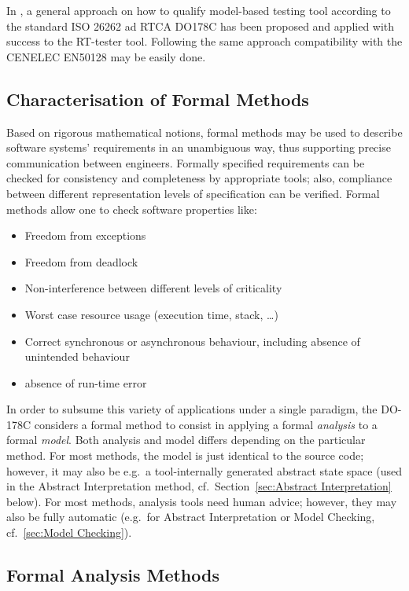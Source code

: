 \documentclass{template/openetcs_report}
\begin{document}
In \cite{brauer_efficient_2012}, a general approach  on how to qualify
model-based testing tool according to the standard ISO 26262 ad RTCA
DO178C has been proposed and applied with success to the RT-tester
tool. Following the same  approach compatibility with the CENELEC EN50128
may be easily done. 


\subsection{Characterisation of Formal Methods}

Based on rigorous mathematical notions, formal methods may be used
to describe software systems' requirements in an unambiguous way,
thus supporting precise communication between engineers.
%
Formally specified requirements can be checked for consistency and
completeness by appropriate tools;
also, compliance between different representation levels of
specification can be verified.
%
Formal methods allow one to check software properties like:

\begin{itemize}
\item Freedom from exceptions
\item Freedom from deadlock
\item Non-interference between different levels of criticality
\item Worst case resource usage (execution time, stack, \ldots)
\item Correct synchronous or asynchronous behaviour,
        including absence of unintended behaviour
\item absence of run-time error
\end{itemize}


In order to subsume this variety of applications under a single
paradigm,
the DO-178C
considers a formal method to consist in applying a
formal {\em analysis} to a formal {\em model}.
%
Both analysis and model differs depending on the particular method.
%
For most methods, the model
is just identical to the source code; however, it may
also be e.g.\ a tool-internally generated abstract state space (used
in the Abstract Interpretation method, cf.\
Section~\ref{sec:Abstract Interpretation} below).
%
For most methods, analysis tools need human advice;
however, they may also be fully automatic (e.g.\ for 
Abstract Interpretation or Model Checking, cf.\
\ref{sec:Model Checking}).

\subsection{Formal Analysis Methods}
\label{sec:formal-analysis}
\end{document}
